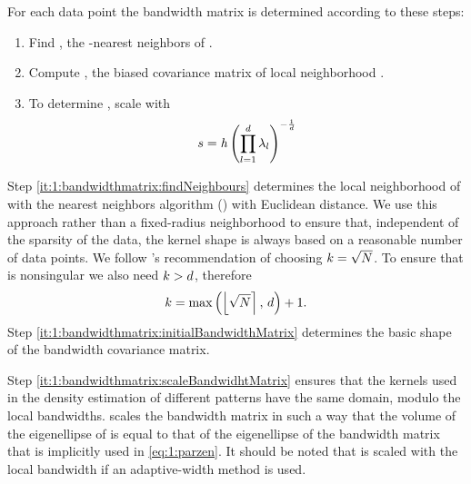 	For each data point \varPattern the bandwidth matrix is determined according to these steps:
		\begin{enumerate}[labelindent=0ex]
			\item \label{it:1:bandwidthmatrix:findNeighbours}
				Find \varNeighborhood{\varPattern}, the \KNNK-nearest neighbors of \varPattern.
			\item \label{it:1:bandwidthmatrix:initialBandwidthMatrix}
				Compute \varCovarianceMatrix, the biased covariance matrix  of local neighborhood \varNeighborhood{\varPattern}.
			\item \label{it:1:bandwidthmatrix:scaleBandwidhtMatrix}
				To determine \varBandwidthMatrix, scale \varCovarianceMatrix with
				\begin{equation}\label{eq:method:scalingFactor}
					s = \mathit{h} \left( \displaystyle\prod_{l = 1}^{d} \lambda_{l} \right)^{-\frac{1}{d}}
				\end{equation}
		\end{enumerate}	
			Step \ref{it:1:bandwidthmatrix:findNeighbours} determines the local neighborhood of \varPattern with the \KNNK nearest neighbors algorithm (\KNN) with Euclidean distance. We use this approach rather than a fixed-radius neighborhood to ensure that, independent of the sparsity of the data, the kernel shape is always based on a reasonable number of data points. 
			We follow \citeauthor{silverman1986density}'s \cite{silverman1986density} recommendation of choosing $k = \sqrt{N}$. To ensure that \varCovarianceMatrix is nonsingular we also need $k > d$, therefore
			\begin{equation*}
				k = \max\left(\left\lfloor \sqrt{N} \right\rceil,\, d \right) + 1.	
			\end{equation*}
			Step \ref{it:1:bandwidthmatrix:initialBandwidthMatrix} determines the basic shape of the bandwidth covariance matrix. 

			Step \ref{it:1:bandwidthmatrix:scaleBandwidhtMatrix} ensures that the kernels used in the density estimation of different patterns have the same domain, modulo the local bandwidths.  scales the bandwidth matrix in such a way that the volume of the eigenellipse of \varBandwidthMatrix is equal to that of the eigenellipse of the bandwidth matrix that is implicitly used in \cref{eq:1:parzen}. It should be noted that \varBandwidthMatrix is scaled with the local bandwidth if an adaptive-width method is used. 